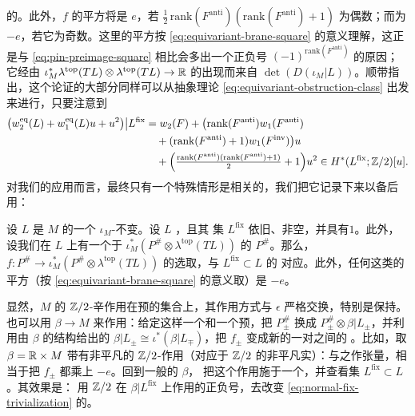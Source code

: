 的\trTrivialization{}。此外，$f$ 的平方将是 $e$，若 $\frac{1}{2}\,\mathrm{rank}(F^{\mathrm{anti}})
(\mathrm{rank}(F^{\mathrm{anti}})+1)$ 为偶数；而为 $-e$，若它为奇数。这里的平方按
\eqref{eq:equivariant-brane-square} 的意义理解，这正是与 \eqref{eq:pin-preimage-square}
相比会多出一个正负号 $(-1)^{\mathrm{rank}(F^{\mathrm{anti}})}$ 的原因；它经由\trPairing{}
$\iota_M^*\lambda^{\mathrm{top}}(TL)\otimes\lambda^{\mathrm{top}}(TL)\to\mathbb{R}$ 的出现而来自
$\det(D(\iota_M|L))$。顺带指出，这个论证的大部分同样可以从抽象\trObstruction{}理论
\eqref{eq:equivariant-obstruction-class} 出发来进行，只要注意到
\begin{equation*}
\begin{aligned}
\bigl(w^{\mathrm{eq}}_2(L)+w^{\mathrm{eq}}_1(L)u+u^2\bigr)\big|L^{\mathrm{fix}}
&=w_2(F)+\bigl(\mathrm{rank}(F^{\mathrm{anti}})w_1(F^{\mathrm{anti}})\\
&\quad+(\mathrm{rank}(F^{\mathrm{anti}})+1)w_1(F^{\mathrm{inv}})\bigr)u\\
&\quad+\Bigl(\tfrac{\mathrm{rank}(F^{\mathrm{anti}})(\mathrm{rank}(F^{\mathrm{anti}})+1)}{2}
+1\Bigr)u^2\in H^*(L^{\mathrm{fix}};\mathbb{Z}/2)[u].
\end{aligned}
\end{equation*}
对我们的应用而言，最终只有一个特殊情形是相关的，我们把它记录下来以备后用：
\begin{lemma}\label{thm:codim-one-iso-coorientations}
设 $L$ 是 $M$ 的一个 $\iota_M$-不变\trLagrange\trSubmanifold。设 $L$ \trConnected，且其%
\trFixedPoint{}集 $L^{\mathrm{fix}}$ 依旧\trConnected、非空，并具有\trCodimension{}$1$。此外，设我们在
$L$ 上有一个\trIsomorphic{}于 $\iota_M^*(P^{\#}\otimes\lambda^{\mathrm{top}}(TL))$ 的%
\trPinStructure{} $P^{\#}$。那么，\trIsomorphism{} $f\colon P^{\#}\to\iota_M^*
(P^{\#}\otimes\lambda^{\mathrm{top}}(TL))$ 的选取，与 $L^{\mathrm{fix}}\subset L$ 的%
\trCoorientation{}\trBijective{}对应。此外，任何这类\trIsomorphism{}的平方（按
\eqref{eq:equivariant-brane-square} 的意义取）是 $-e$。
\noqed
\end{lemma}
显然，$M$ 的 $\mathbb{Z}/2$-\trEquivariant{}\trGrading{}辛\trAutomorphism{}作用在预\trEquivariant{}\trBrane{}的集合上，其作用方式与%
\trInvolution{} $\epsilon$ 严格交换，特别是保持\trEquivariant{}\trBrane。也可以用\trEquivariant{}\trLineBundle{}
$\beta\to M$ 来作用：给定这样一个\trLineBundle{}和一个预\trEquivariant{}\trBrane，把 $P^{\#}_\pm$
换成 $P^{\#}_\pm\otimes\beta|L_\pm$，并利用由 $\beta$ 的\trEquivariant{}结构给出的\trIsomorphism{}
$\beta|L_\pm\cong\iota^*(\beta|L_\mp)$，把 $f_\pm$ 变成新的一对\trPinStructure{}之间的%
\trIsomorphism。比如，取 $\beta=\mathbb{R}\times M$ 带有非平凡的 $\mathbb{Z}/2$-作用（对应于 $\mathbb{Z}/2$
的非平凡实\trCharacter）：与之作张量，相当于把 $f_\pm$ 都乘上 $-e$。回到一般的 $\beta$，
把这个作用施于一个\trEquivariant{}\trBrane，并查看\trFixedPoint{}集 $L^{\mathrm{fix}}\subset L$。其效果是：
用 $\mathbb{Z}/2$ 在 $\beta|L^{\mathrm{fix}}$ 上作用的正负号，去改变 \eqref{eq:normal-fix-trivialization}
的\trTrivialization{}。
